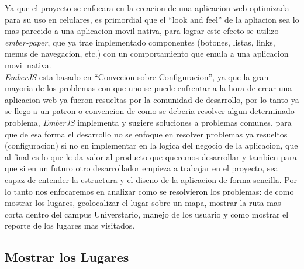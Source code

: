 Ya que el proyecto se enfocara en la creacion de una aplicacion web optimizada para su uso en celulares, es primordial que el ``look and feel'' de la apliacion sea lo mas parecido a una aplicacion movil nativa, para lograr este efecto se utilizo \emph{ember-paper}, que ya trae implementado componentes (botones, listas, links, menus de navegacion, etc.) con un comportamiento que emula a una aplicacion movil nativa.\\


\emph{EmberJS} esta basado en ``Convecion sobre Configuracion'', ya que la gran mayoria de los problemas con que uno se puede enfrentar a la hora de crear una aplicacion web ya fueron resueltas por la comunidad de desarrollo, por lo tanto ya se llego a un patron o convencion de como se deberia resolver algun determinado problema, \emph{EmberJS} implementa y sugiere soluciones a problemas comunes, para que de esa forma el desarrollo no se enfoque  en resolver problemas ya resueltos (configuracion) si no en implementar en la logica del negocio de la aplicacion, que al final es lo que le da valor al producto que queremos desarrollar y tambien para que si en un futuro otro desarrollador empieza a trabajar en el proyecto, sea capaz de entender la estructura y el diseno de la aplicacion de forma sencilla. Por lo tanto nos enfocaremos en analizar como se resolvieron los problemas: de como mostrar los lugares, geolocalizar el lugar sobre un mapa, mostrar la ruta mas corta dentro del campus Universtario, manejo de los usuario y como mostrar el reporte de los lugares mas visitados.

\subsection{Mostrar los Lugares}
\label{sub:Mostrar los Lugares}




%
%
%


